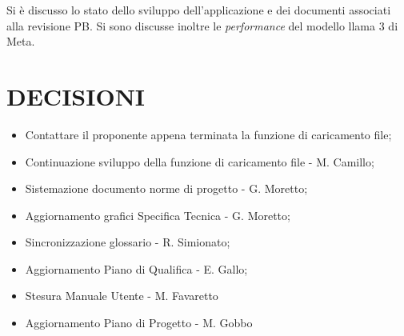 \documentclass[5pt]{article}
\begin{document}
Si è discusso lo stato dello sviluppo dell'applicazione e dei documenti associati alla revisione PB. Si sono discusse inoltre le \textit{performance} del modello llama 3 di Meta.
\section{DECISIONI}
\begin{itemize}
	\item Contattare il proponente appena terminata la funzione di caricamento file;
	\item Continuazione sviluppo della funzione di caricamento file - M. Camillo;
	\item Sistemazione documento norme di progetto - G. Moretto;
	\item Aggiornamento grafici Specifica Tecnica - G. Moretto;
	\item Sincronizzazione glossario - R. Simionato;
	\item Aggiornamento Piano di Qualifica - E. Gallo;
	\item Stesura Manuale Utente - M. Favaretto
	\item Aggiornamento Piano di Progetto - M. Gobbo
\end{itemize}
\end{document}
